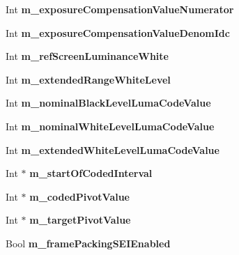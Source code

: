 \begin{DoxyCompactItemize}
\mbox{\label{class_t_app_enc_cfg_a8ad9ad7d9b8540f18deae09319b64226}} 
Int {\bfseries m\+\_\+exposure\+Compensation\+Value\+Numerator}
\item 
\mbox{\label{class_t_app_enc_cfg_af1c12d68f2386a4bdc8432a4399146cb}} 
Int {\bfseries m\+\_\+exposure\+Compensation\+Value\+Denom\+Idc}
\item 
\mbox{\label{class_t_app_enc_cfg_a6ebcbc2445178c5dccd38cbd9269f6db}} 
Int {\bfseries m\+\_\+ref\+Screen\+Luminance\+White}
\item 
\mbox{\label{class_t_app_enc_cfg_ab0f2c265a85e2ae24ac403a818ffaf64}} 
Int {\bfseries m\+\_\+extended\+Range\+White\+Level}
\item 
\mbox{\label{class_t_app_enc_cfg_aebde816e5e0bf3afbd3af08cb626ee59}} 
Int {\bfseries m\+\_\+nominal\+Black\+Level\+Luma\+Code\+Value}
\item 
\mbox{\label{class_t_app_enc_cfg_aed5ab1ab0d7421f406556f6913f50b9d}} 
Int {\bfseries m\+\_\+nominal\+White\+Level\+Luma\+Code\+Value}
\item 
\mbox{\label{class_t_app_enc_cfg_addd63ed89da5f9129caa96cd76d03b37}} 
Int {\bfseries m\+\_\+extended\+White\+Level\+Luma\+Code\+Value}
\item 
\mbox{\label{class_t_app_enc_cfg_ae7c7d2219d01ad1953ee8b0524a874ce}} 
Int $\ast$ {\bfseries m\+\_\+start\+Of\+Coded\+Interval}
\item 
\mbox{\label{class_t_app_enc_cfg_a1fb7950208dbfa1082929661efd766af}} 
Int $\ast$ {\bfseries m\+\_\+coded\+Pivot\+Value}
\item 
\mbox{\label{class_t_app_enc_cfg_ad53444ef650777570458d5b6b9354b40}} 
Int $\ast$ {\bfseries m\+\_\+target\+Pivot\+Value}
\item 
\mbox{\label{class_t_app_enc_cfg_a4b68cea767d86553c30fbeb7e9c44051}} 
Bool {\bfseries m\+\_\+frame\+Packing\+S\+E\+I\+Enabled}

\end{DoxyCompactItemize}

